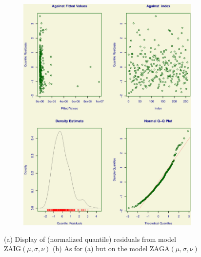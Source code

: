 \documentclass[
]{article}
\begin{document}
\begin{figure}
\begin{subfigure}[b]{0.5\textwidth}
   \includegraphics[width=1\linewidth]{ROC_4Plot_ZAGA.eps}
   \caption{}
   \label{Residuals_ZAGA}
\end{subfigure}

\caption[Normalized quantile residuals from models ZAIG \& ZAGA]{(a) Display of (normalized quantile) residuals from model $\mbox{ZAIG}(\mu,\sigma,\nu)$ (b) As for (a) but on the model $\mbox{ZAGA}(\mu,\sigma,\nu)$}
\end{figure}
\end{document}
